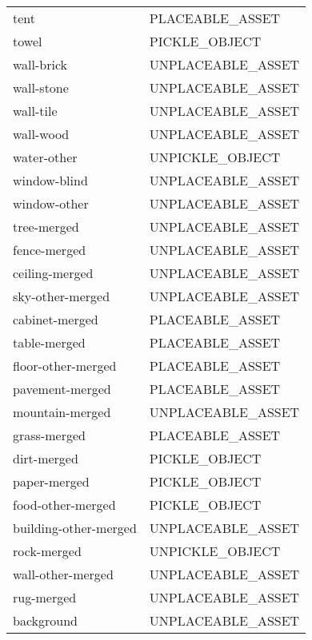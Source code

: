 \begin{supertabular}{|l|l|}
  tent                  & \tiny{PLACEABLE\_ASSET  } \\
  towel                 & \tiny{PICKLE\_OBJECT    } \\
  wall-brick            & \tiny{UNPLACEABLE\_ASSET} \\
  wall-stone            & \tiny{UNPLACEABLE\_ASSET} \\
  wall-tile             & \tiny{UNPLACEABLE\_ASSET} \\
  wall-wood             & \tiny{UNPLACEABLE\_ASSET} \\
  water-other           & \tiny{UNPICKLE\_OBJECT  } \\
  window-blind          & \tiny{UNPLACEABLE\_ASSET} \\
  window-other          & \tiny{UNPLACEABLE\_ASSET} \\
  tree-merged           & \tiny{UNPLACEABLE\_ASSET} \\
  fence-merged          & \tiny{UNPLACEABLE\_ASSET} \\
  ceiling-merged        & \tiny{UNPLACEABLE\_ASSET} \\
  sky-other-merged      & \tiny{UNPLACEABLE\_ASSET} \\
  cabinet-merged        & \tiny{PLACEABLE\_ASSET  } \\
  table-merged          & \tiny{PLACEABLE\_ASSET  } \\
  floor-other-merged    & \tiny{PLACEABLE\_ASSET  } \\
  pavement-merged       & \tiny{PLACEABLE\_ASSET  } \\
  mountain-merged       & \tiny{UNPLACEABLE\_ASSET} \\
  grass-merged          & \tiny{PLACEABLE\_ASSET  } \\
  dirt-merged           & \tiny{PICKLE\_OBJECT    } \\
  paper-merged          & \tiny{PICKLE\_OBJECT    } \\
  food-other-merged     & \tiny{PICKLE\_OBJECT    } \\
  building-other-merged & \tiny{UNPLACEABLE\_ASSET} \\
  rock-merged           & \tiny{UNPICKLE\_OBJECT  } \\
  wall-other-merged     & \tiny{UNPLACEABLE\_ASSET} \\
  rug-merged            & \tiny{UNPLACEABLE\_ASSET} \\
  background            & \tiny{UNPLACEABLE\_ASSET} \\
\end{supertabular}
\pagebreak
\onecolumn

